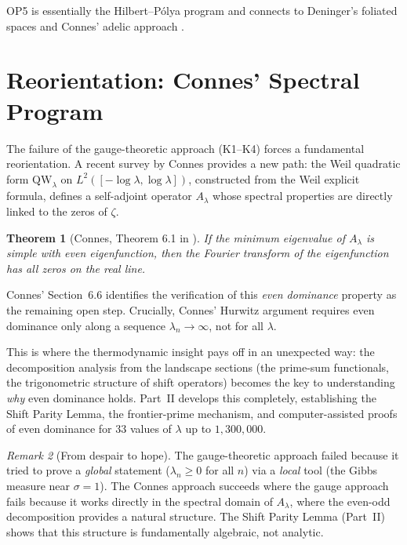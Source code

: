 \documentclass[12pt,a4paper]{article}
\newtheorem{theorem}{Theorem}[section]
\theoremstyle{definition}
\theoremstyle{remark}
\newtheorem{remark}[theorem]{Remark}
\begin{document}
OP5 is essentially the Hilbert--P\'olya program and connects to Deninger's foliated spaces \cite{Deninger2002} and Connes' adelic approach \cite{Connes1999}.


\section{Reorientation: Connes' Spectral Program}
\label{sec:reorientation}

The failure of the gauge-theoretic approach (K1--K4) forces a fundamental reorientation. A recent survey by Connes \cite{Connes2025} provides a new path: the Weil quadratic form $\mathrm{QW}_\lambda$ on $L^2([-\log\lambda, \log\lambda])$, constructed from the Weil explicit formula, defines a self-adjoint operator $A_\lambda$ whose spectral properties are directly linked to the zeros of $\zeta$.

\begin{theorem}[Connes, Theorem 6.1 in \cite{Connes2025}]
If the minimum eigenvalue of $A_\lambda$ is simple with even eigenfunction, then the Fourier transform of the eigenfunction has all zeros on the real line.
\end{theorem}

Connes' Section~6.6 identifies the verification of this \emph{even dominance} property as the remaining open step. Crucially, Connes' Hurwitz argument requires even dominance only along a sequence $\lambda_n \to \infty$, not for all $\lambda$.

This is where the thermodynamic insight pays off in an unexpected way: the decomposition analysis from the landscape sections (the prime-sum functionals, the trigonometric structure of shift operators) becomes the key to understanding \emph{why} even dominance holds. Part~II develops this completely, establishing the Shift Parity Lemma, the frontier-prime mechanism, and computer-assisted proofs of even dominance for $33$ values of $\lambda$ up to $1{,}300{,}000$.

\begin{remark}[From despair to hope]
The gauge-theoretic approach failed because it tried to prove a \emph{global} statement ($\lambda_n \geq 0$ for all $n$) via a \emph{local} tool (the Gibbs measure near $\sigma = 1$). The Connes approach succeeds where the gauge approach fails because it works directly in the spectral domain of $A_\lambda$, where the even-odd decomposition provides a natural structure. The Shift Parity Lemma (Part~II) shows that this structure is fundamentally algebraic, not analytic.
\end{remark}
\end{document}

